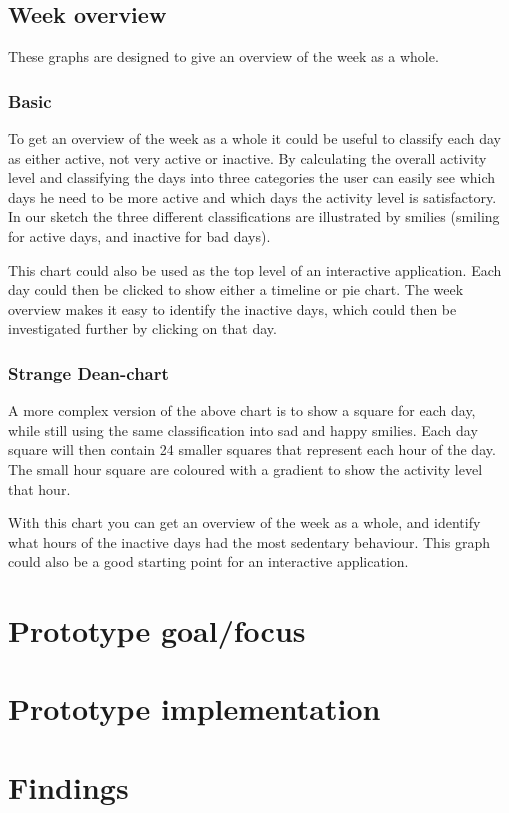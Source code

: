\subsection{Week overview}
These graphs are designed to give an overview of the week as a whole. %
\subsubsection{Basic}
To get an overview of the week as a whole it could be useful to classify each day as either active, not very active or inactive. By calculating the overall activity level and classifying the days into three categories the user can easily see which days he need to be more active and which days the activity level is satisfactory. In our sketch the three different classifications are illustrated by smilies (smiling for active days, and inactive for bad days). 

This chart could also be used as the top level of an interactive application. Each day could then be clicked to show either a timeline or pie chart. The week overview makes it easy to identify the inactive days, which could then be investigated further by clicking on that day.

\subsubsection{Strange Dean-chart}
A more complex version of the above chart is to show a square for each day, while still using the same classification into sad and happy smilies. Each day square will then contain 24 smaller squares that represent each hour of the day. The small hour square are coloured with a gradient to show the activity level that hour.

With this chart you can get an overview of the week as a whole, and identify what hours of the inactive days had the most sedentary behaviour. This graph could also be a good starting point for an interactive application.

\section{Prototype goal/focus}

\section{Prototype implementation}

\section{Findings}
